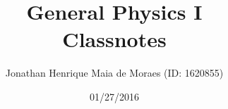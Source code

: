 \title{General Physics I \\ Classnotes}
\author{Jonathan Henrique Maia de Moraes (ID: 1620855)}
\date{01/27/2016}
\maketitle
